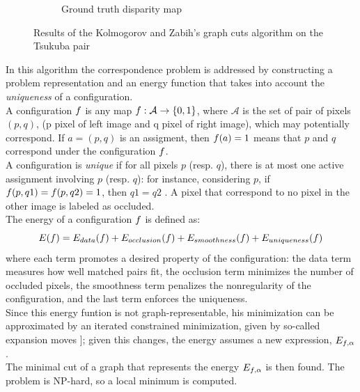 \begin{figure}[h!]
\begin{subfigure}[]{0.4\textwidth}
\caption{\scriptsize{Ground truth disparity map}}
\label{disparity}
\end{subfigure}%
\caption{\small{Results of the Kolmogorov and Zabih's graph cuts algorithm on the Tsukuba pair}}
\end{figure}

\newpage
In this algorithm the correspondence problem is addressed by constructing a problem representation
and an energy function that takes into account the \textit{uniqueness} of a configuration.\\
A configuration $\mathnormal{f}$ is any map $\mathnormal{f}: \mathcal{A} \rightarrow \{0,1\}$, where $ \mathcal{A}$ is the set of pair of pixels $(p,q)$, (p pixel of left image and q pixel of right image), which may potentially correspond. If $a = (p,q)$ is an assigment, then $\mathnormal{f}(a) = 1$ means that $p$  and $q$ correspond under the configuration $\mathnormal{f}$.\\
A configuration is \textit{unique} if for all pixels $p$ (resp. $q$), there is at
most one active assignment involving $p$ (resp. $q$): for instance, considering $p$, if $\mathnormal{f}(p, q1) = \mathnormal{f}(p, q2) = 1$,
then $q1 = q2$ . A pixel that correspond to no
pixel in the other image is labeled as occluded.\\
The energy of a configuration  $\mathnormal{f}$ is  defined as: 
\begin{equation}
\mathnormal{E}(\mathnormal{f}) = \mathnormal{E}_{data}(\mathnormal{f}) + \mathnormal{E}_{occlusion}(\mathnormal{f}) +\mathnormal{E}_{smoothness}(\mathnormal{f}) +\mathnormal{E}_{uniqueness}(\mathnormal{f})
\end{equation}
where each term promotes a desired property of the configuration: the data term measures how well matched pairs fit, the occlusion term minimizes the number of occluded pixels, the smoothness term penalizes the nonregularity of the configuration,
and the last term enforces the uniqueness.\\
Since this energy funtion is not graph-representable, his minimization can be approximated by an iterated constrained minimization, given by so-called expansion moves \cite{ALPHA}]; given this changes, the energy assumes a new expression, $\mathnormal{E}_{\mathnormal{f},\alpha}$
.\\
The minimal cut of a graph that represents the energy $\mathnormal{E}_{\mathnormal{f},\alpha}$ is then found. The problem is NP-hard, so a local minimum is computed. 




